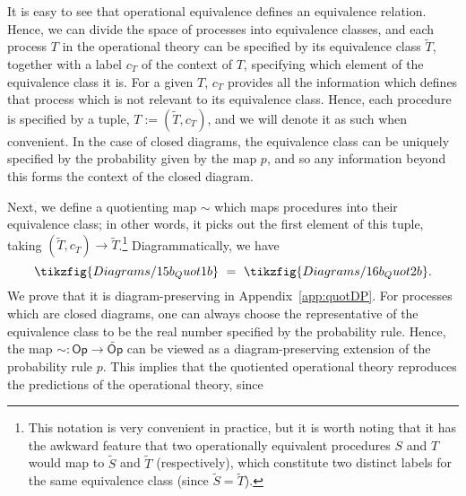 \documentclass[10pt,twocolumn,aps,groupedaddress,nofootinbib]{revtex4}
\newcommand\Op{\mathsf{Op}}
\begin{document}
It is easy to see that operational equivalence defines an equivalence relation. Hence, we can divide the space of processes into equivalence classes, and each process $T$ in the operational theory can be specified by its equivalence class $\widetilde{T}$, together with a label $c_T$ of the context of $T$, specifying which element of the equivalence class it is. For a given $T$, $c_T$ provides all the information which defines that process which is not relevant to its equivalence class. Hence, each procedure is specified by a tuple, $T :=(\widetilde{T},c_T)$, and we will denote it as such when convenient. In the case of closed diagrams, the equivalence class can be uniquely specified by the probability given by the map $p$, and so any information beyond this forms the context of the closed diagram.

Next, we define a quotienting map $\sim$ which maps procedures into their equivalence class; in other words, it picks out the first element of this tuple, taking $(\widetilde{T},c_T) \to \widetilde{T}$.\footnote{ This notation is very convenient in practice, but it is worth noting that it has the awkward feature that two operationally equivalent procedures $S$ and $T$ would map to $\widetilde{S}$ and $\widetilde{T}$ (respectively), which constitute two distinct labels for the same equivalence class (since $\widetilde{S}=\widetilde{T}$).  } Diagrammatically, we have
\[\tikzfig{Diagrams/15b_Quot1b}\ =\ \tikzfig{Diagrams/16b_Quot2b}.\]
We prove that it is diagram-preserving in Appendix~\ref{app:quotDP}. 
For processes which are closed diagrams, one can always choose the representative of the equivalence class to be the real number specified by the probability rule. 
Hence, the map \colorbox{black!50!blue!30!}{$\sim:\Op\to\widetilde{\Op}$} can be viewed as a diagram-preserving extension of the probability rule $p$. 
This implies that the quotiented operational theory reproduces the predictions of the operational theory, since
\beq\label{eq:GPTProbs}
\end{document}
